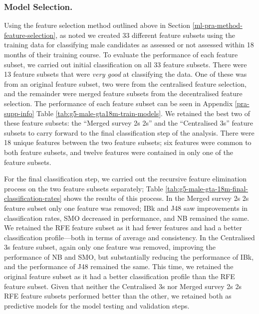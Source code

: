 \documentclass[
  12pt,
  a4paper,
]{book}
\begin{document}
\hypertarget{model-selection.-1}{%
\subsubsection{Model Selection.}\label{model-selection.-1}}

Using the feature selection method outlined above in Section \ref{ml-pra-method-feature-selection}, as noted we created 33 different feature subsets using the training data for classifying male candidates as assessed or not assessed within 18 months of their training course. To evaluate the performance of each feature subset, we carried out initial classification on all 33 feature subsets. There were 13 feature subsets that were \emph{very good} at classifying the data. One of these was from an original feature subset, two were from the centralised feature selection, and the remainder were merged feature subsets from the decentralised feature selection. The performance of each feature subset can be seen in Appendix \ref{pra-supp-info} Table \ref{tab:g5-male-gta18m-train-models}. We retained the best two of these feature subsets: the ``Merged survey 2s 2s'' and the ``Centralised 3s'' feature subsets to carry forward to the final classification step of the analysis. There were 18 unique features between the two feature subsets; six features were common to both feature subsets, and twelve features were contained in only one of the feature subsets.

For the final classification step, we carried out the recursive feature elimination process on the two feature subsets separately; Table \ref{tab:g5-male-gta-18m-final-classification-rates} shows the results of this process. In the Merged survey 2s 2s feature subset only one feature was removed; IBk and J48 saw improvements in classification rates, SMO decreased in performance, and NB remained the same. We retained the RFE feature subset as it had fewer features and had a better classification profile---both in terms of average and consistency. In the Centralised 3s feature subset, again only one feature was removed, improving the performance of NB and SMO, but substantially reducing the performance of IBk, and the performance of J48 remained the same. This time, we retained the original feature subset as it had a better classification profile than the RFE feature subset. Given that neither the Centralised 3s nor Merged survey 2s 2s RFE feature subsets performed better than the other, we retained both as predictive models for the model testing and validation steps.
\end{document}
